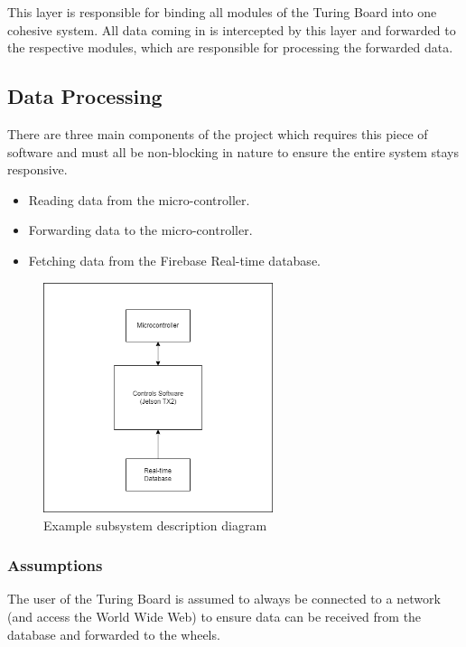 
This layer is responsible for binding all modules of the Turing Board into one cohesive system. All data coming in is intercepted by this layer and forwarded to the respective modules, which are responsible for processing the forwarded data.

\subsection{Data Processing}
There are three main components of the project which requires this piece of software and must all be non-blocking in nature to ensure the entire system stays responsive.
\begin{itemize}
    \item Reading data from the micro-controller.
    \item Forwarding data to the micro-controller.
    \item Fetching data from the Firebase Real-time database.
\end{itemize}

\begin{figure}[h!]
	\centering
 	\includegraphics[width=0.60\textwidth]{images/Controls Software Subsystem.drawio.png}
 \caption{Example subsystem description diagram}
\end{figure}

\subsubsection{Assumptions}
The user of the Turing Board is assumed to always be connected to a network (and access the World Wide Web) to ensure data can be received from the database and forwarded to the wheels.

